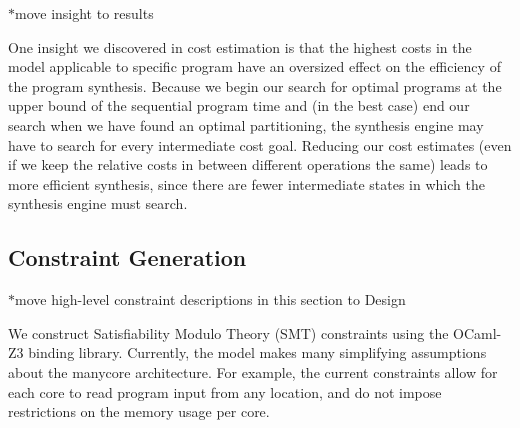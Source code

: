 \documentclass{sig-alternate-05-2015}
\newcommand{\note}{\color{red}$*$}
\begin{document}
{\note move insight to results}

One insight we discovered in cost estimation is that the highest costs in the model applicable to specific program have an oversized effect on the efficiency of the program synthesis. Because we begin our search for optimal programs at the upper bound of the sequential program time and (in the best case) end our search when we have found an optimal partitioning, the synthesis engine may have to search for every intermediate cost goal. Reducing our cost estimates (even if we keep the relative costs in between different operations the same) leads to more efficient synthesis, since there are fewer intermediate states in which the synthesis engine must search. 

\subsection{Constraint Generation}

{\note move high-level constraint descriptions in this section to Design}

We construct Satisfiability Modulo Theory (SMT) constraints using the OCaml-Z3 binding library. Currently, the model makes many simplifying assumptions about the manycore architecture. For example, the current constraints allow for each core to read program input from any location, and do not impose restrictions on the memory usage per core. 
\end{document}
